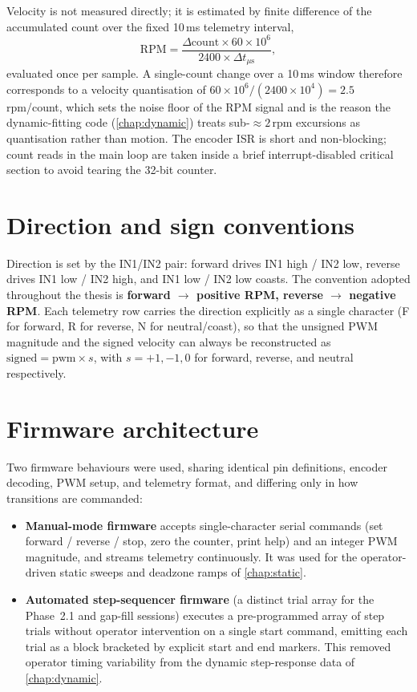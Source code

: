 Velocity is not measured directly; it is estimated by finite difference of the accumulated count over the fixed 10\,ms telemetry interval,
\begin{equation}
  \mathrm{RPM} = \frac{\Delta\mathrm{count}\times 60\times 10^{6}}{2400\times \Delta t_{\mu\mathrm{s}}},
  \label{eq:rpm}
\end{equation}
evaluated once per sample. A single-count change over a 10\,ms window therefore corresponds to a velocity quantisation of $60\times 10^{6}/(2400\times 10^{4}) = 2.5$\,rpm/count, which sets the noise floor of the RPM signal and is the reason the dynamic-fitting code (\cref{chap:dynamic}) treats sub-${\approx}2$\,rpm excursions as quantisation rather than motion. The encoder ISR is short and non-blocking; count reads in the main loop are taken inside a brief interrupt-disabled critical section to avoid tearing the 32-bit counter.

\section{Direction and sign conventions}
\label{sec:conventions}

Direction is set by the IN1/IN2 pair: forward drives IN1 high / IN2 low, reverse drives IN1 low / IN2 high, and IN1 low / IN2 low coasts. The convention adopted throughout the thesis is \textbf{forward $\to$ positive RPM, reverse $\to$ negative RPM}. Each telemetry row carries the direction explicitly as a single character (F for forward, R for reverse, N for neutral/coast), so that the unsigned PWM magnitude and the signed velocity can always be reconstructed as $\mathrm{signed} = \mathrm{pwm}\times s$, with $s = +1, -1, 0$ for forward, reverse, and neutral respectively.

\section{Firmware architecture}
\label{sec:firmware}

Two firmware behaviours were used, sharing identical pin definitions, encoder decoding, PWM setup, and telemetry format, and differing only in how transitions are commanded:
\begin{itemize}
  \item \textbf{Manual-mode firmware} accepts single-character serial commands (set forward / reverse / stop, zero the counter, print help) and an integer PWM magnitude, and streams telemetry continuously. It was used for the operator-driven static sweeps and deadzone ramps of \cref{chap:static}.
  \item \textbf{Automated step-sequencer firmware} (a distinct trial array for the Phase~2.1 and gap-fill sessions) executes a pre-programmed array of step trials without operator intervention on a single start command, emitting each trial as a block bracketed by explicit start and end markers. This removed operator timing variability from the dynamic step-response data of \cref{chap:dynamic}.
\end{itemize}

